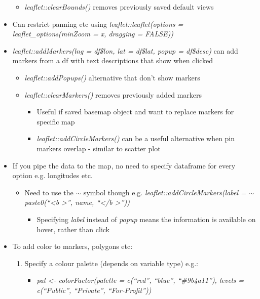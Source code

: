 \documentclass{article}
\begin{document}
\begin{itemize}
    \begin{itemize}
        \item \textit{leaflet::clearBounds()} removes previously saved default views
    \end{itemize}
    \item Can restrict panning etc using \textit{leaflet::leaflet(options = leaflet\_options(minZoom = x, dragging = FALSE))}
    \item \textit{leaflet::addMarkers(lng = df\$lon, lat = df\$lat, popup = df\$desc)} can add markers from a df with text descriptions that show when clicked
    \begin{itemize}
        \item \textit{leaflet::addPopups()} alternative that don't show markers
        \item \textit{leaflet::clearMarkers()} removes previously added markers
        \begin{itemize}
            \item Useful if saved basemap object and want to replace markers for specific map
            \item \textit{leaflet::addCircleMarkers()} can be a useful alternative when pin markers overlap - similar to scatter plot
        \end{itemize}
    \end{itemize}
    \item If you pipe the data to the map, no need to specify dataframe for every option e.g. longitudes etc.
    \begin{itemize}
        \item Need to use the $\sim$ symbol though e.g. \textit{leaflet::addCircleMarkers(label = $\sim$paste0(``\textless b \textgreater'', name, ``\textless /b \textgreater''))}
        \begin{itemize}
            \item Specifying \textit{label} instead of \textit{popup} means the information is available on hover, rather than click
        \end{itemize}
    \end{itemize}
    \item To add color to markers, polygons etc:
    \begin{enumerate}
        \item Specify a colour palette (depends on variable type) e.g.:
        \begin{itemize}
            \item \textit{pal \textless- colorFactor(palette = c(``red'', ``blue'', ``\#9b4a11''), levels = c(``Public'', ``Private'', ``For-Profit''))}

\end{itemize}
\end{enumerate}
\end{itemize}
\end{document}
